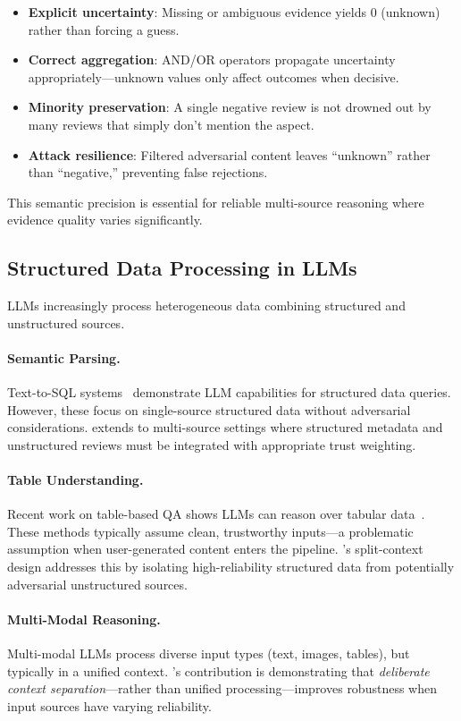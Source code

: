 \begin{itemize}[nosep]
    \item \textbf{Explicit uncertainty}: Missing or ambiguous evidence yields 0 (unknown) rather than forcing a guess.
    \item \textbf{Correct aggregation}: AND/OR operators propagate uncertainty appropriately---unknown values only affect outcomes when decisive.
    \item \textbf{Minority preservation}: A single negative review is not drowned out by many reviews that simply don't mention the aspect.
    \item \textbf{Attack resilience}: Filtered adversarial content leaves ``unknown'' rather than ``negative,'' preventing false rejections.
\end{itemize}

This semantic precision is essential for reliable multi-source reasoning where evidence quality varies significantly.

\subsection{Structured Data Processing in LLMs}

LLMs increasingly process heterogeneous data combining structured and unstructured sources.

\paragraph{Semantic Parsing.}
Text-to-SQL systems~\cite{yu2018spider} demonstrate LLM capabilities for structured data queries.
However, these focus on single-source structured data without adversarial considerations.
\method extends to multi-source settings where structured metadata and unstructured reviews must be integrated with appropriate trust weighting.

\paragraph{Table Understanding.}
Recent work on table-based QA shows LLMs can reason over tabular data~\cite{chen2020hybridqa}.
These methods typically assume clean, trustworthy inputs---a problematic assumption when user-generated content enters the pipeline.
\method's split-context design addresses this by isolating high-reliability structured data from potentially adversarial unstructured sources.

\paragraph{Multi-Modal Reasoning.}
Multi-modal LLMs process diverse input types (text, images, tables), but typically in a unified context.
\method's contribution is demonstrating that \emph{deliberate context separation}---rather than unified processing---improves robustness when input sources have varying reliability.


